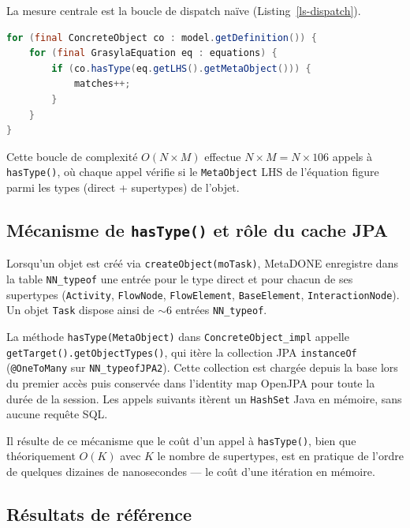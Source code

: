 La mesure centrale est la boucle de dispatch naïve (Listing~\ref{ls-dispatch}).

\begin{lstlisting}[language=Java,
  caption={Boucle de dispatch naïve $O(N \times M)$},
  label={ls-dispatch}]
for (final ConcreteObject co : model.getDefinition()) {
    for (final GrasylaEquation eq : equations) {
        if (co.hasType(eq.getLHS().getMetaObject())) {
            matches++;
        }
    }
}
\end{lstlisting}

Cette boucle de complexité $O(N \times M)$ effectue $N \times M = N \times 106$
appels à \texttt{hasType()}, où chaque appel vérifie si le
\texttt{MetaObject} LHS de l'équation figure parmi les types (direct +
supertypes) de l'objet.

\subsection{Mécanisme de \texttt{hasType()} et rôle du cache JPA}

Lorsqu'un objet est créé via \texttt{createObject(moTask)}, MetaDONE
enregistre dans la table \texttt{NN\_typeof} une entrée pour le type direct
et pour chacun de ses supertypes
(\texttt{Activity}, \texttt{FlowNode}, \texttt{FlowElement},
\texttt{BaseElement}, \texttt{InteractionNode}). Un objet \texttt{Task}
dispose ainsi de $\sim$6 entrées \texttt{NN\_typeof}.

La méthode \texttt{hasType(MetaObject)} dans \texttt{ConcreteObject\_impl}
appelle \texttt{getTarget().getObjectTypes()}, qui itère la collection JPA
\texttt{instanceOf} (\texttt{@OneToMany} sur \texttt{NN\_typeofJPA2}). Cette
collection est chargée depuis la base lors du premier accès puis conservée
dans l'identity map OpenJPA pour toute la durée de la session. Les appels
suivants itèrent un \texttt{HashSet} Java en mémoire, sans aucune requête
SQL.

Il résulte de ce mécanisme que le coût d'un appel à \texttt{hasType()},
bien que théoriquement $O(K)$ avec $K$ le nombre de supertypes, est en
pratique de l'ordre de quelques dizaines de nanosecondes — le coût d'une
itération en mémoire.

\subsection{Résultats de référence}

